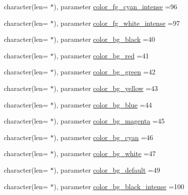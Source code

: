 \begin{DoxyCompactItemize}
\item 
character(len= $\ast$), parameter \mbox{\hyperlink{namespacem__escape_a58a755722e6672a1fe8ef98637540105}{color\+\_\+fg\+\_\+cyan\+\_\+intense}} =\textquotesingle{}96\textquotesingle{}
\item 
character(len= $\ast$), parameter \mbox{\hyperlink{namespacem__escape_ac0eb5968bfff3dfa064ec28b5218b2bf}{color\+\_\+fg\+\_\+white\+\_\+intense}} =\textquotesingle{}97\textquotesingle{}
\item 
character(len= $\ast$), parameter \mbox{\hyperlink{namespacem__escape_a5e4fc9941494a5c9518c84b434bfc97b}{color\+\_\+bg\+\_\+black}} =\textquotesingle{}40\textquotesingle{}
\item 
character(len= $\ast$), parameter \mbox{\hyperlink{namespacem__escape_ad219a6232dbaeb100a6e6cdc0365ee22}{color\+\_\+bg\+\_\+red}} =\textquotesingle{}41\textquotesingle{}
\item 
character(len= $\ast$), parameter \mbox{\hyperlink{namespacem__escape_a7c50b2b50909acf5935f9de7642d30f3}{color\+\_\+bg\+\_\+green}} =\textquotesingle{}42\textquotesingle{}
\item 
character(len= $\ast$), parameter \mbox{\hyperlink{namespacem__escape_a7bd0a1c173252170ccf6976b961fa1c3}{color\+\_\+bg\+\_\+yellow}} =\textquotesingle{}43\textquotesingle{}
\item 
character(len= $\ast$), parameter \mbox{\hyperlink{namespacem__escape_a699e7848c3c43f328168d59211d054cc}{color\+\_\+bg\+\_\+blue}} =\textquotesingle{}44\textquotesingle{}
\item 
character(len= $\ast$), parameter \mbox{\hyperlink{namespacem__escape_a73300e9f70a7abb1ec2a2bdb55194ae5}{color\+\_\+bg\+\_\+magenta}} =\textquotesingle{}45\textquotesingle{}
\item 
character(len= $\ast$), parameter \mbox{\hyperlink{namespacem__escape_a895ed90037352c2ce2be6353f6764cb8}{color\+\_\+bg\+\_\+cyan}} =\textquotesingle{}46\textquotesingle{}
\item 
character(len= $\ast$), parameter \mbox{\hyperlink{namespacem__escape_a26cfeb6eefc9cd1a2c9f419db077ecb1}{color\+\_\+bg\+\_\+white}} =\textquotesingle{}47\textquotesingle{}
\item 
character(len= $\ast$), parameter \mbox{\hyperlink{namespacem__escape_af84f93410fbe9fa8fea3b02ac9371833}{color\+\_\+bg\+\_\+default}} =\textquotesingle{}49\textquotesingle{}
\item 
character(len= $\ast$), parameter \mbox{\hyperlink{namespacem__escape_a80a991f9ee93243b6b9bea07f2ec6d03}{color\+\_\+bg\+\_\+black\+\_\+intense}} =\textquotesingle{}100\textquotesingle{}

\end{DoxyCompactItemize}
